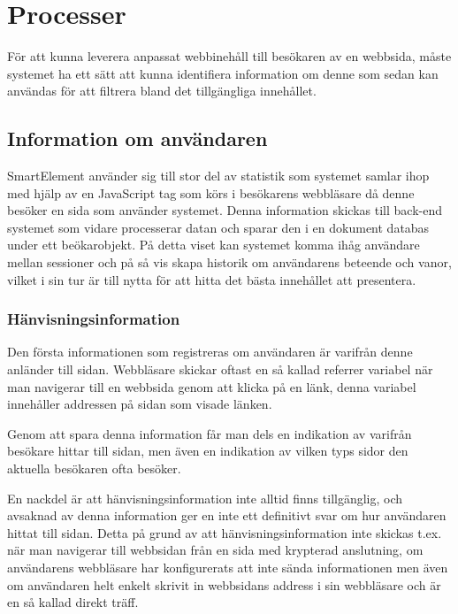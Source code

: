 \section{Processer}

För att kunna leverera anpassat webbinehåll till besökaren av en webbsida, måste systemet ha ett sätt att kunna identifiera information om denne som sedan kan användas för att filtrera bland det tillgängliga innehållet.

\subsection{Information om användaren}

SmartElement använder sig till stor del av statistik som systemet samlar ihop med hjälp av en JavaScript tag som körs i besökarens webbläsare då denne besöker en sida som använder systemet. Denna information skickas till back-end systemet som vidare processerar datan och sparar den i en dokument databas under ett beökarobjekt. På detta viset kan systemet komma ihåg användare mellan sessioner och på så vis skapa historik om användarens beteende och vanor, vilket i sin tur är till nytta för att hitta det bästa innehållet att presentera.

\subsubsection{Hänvisningsinformation}

Den första informationen som registreras om användaren är varifrån denne anländer till sidan. Webbläsare skickar oftast en så kallad referrer variabel när man navigerar till en webbsida genom att klicka på en länk, denna variabel innehåller addressen på sidan som visade länken.

Genom att spara denna information får man dels en indikation av varifrån besökare hittar till sidan, men även en indikation av vilken typs sidor den aktuella besökaren ofta besöker.

En nackdel är att hänvisningsinformation inte alltid finns tillgänglig, och avsaknad av denna information ger en inte ett definitivt svar om hur användaren hittat till sidan. Detta på grund av att hänvisningsinformation inte skickas t.ex. när man navigerar till webbsidan från en sida med krypterad anslutning, om användarens webbläsare har konfigurerats att inte sända informationen men även om användaren helt enkelt skrivit in webbsidans address i sin webbläsare och är en så kallad direkt träff. \citep{httprfc}

